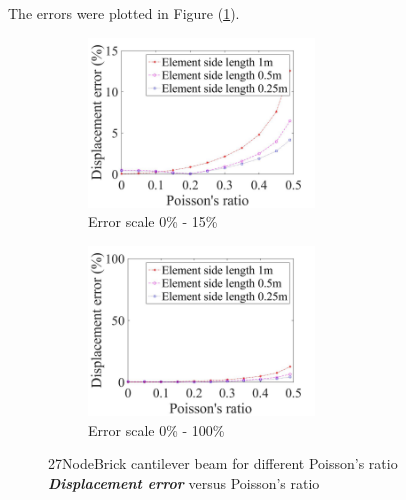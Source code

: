 \documentclass[fleqn,11pt,letter]{article}
\begin{document}
The errors were plotted in Figure (\ref{fig error 27NodeBrick cantilever beam for different Poisson's ratio}).

\begin{figure}[H]
  \begin{subfigure}{0.5\textwidth}
    \centering
    \includegraphics[width=6cm]{../Figure_files/27NodeBrick/error27brick_beam_different_poisson_ratio_disp_div.jpeg}
    \caption{Error scale 0\% - 15\%}
  \end{subfigure}
  \begin{subfigure}{0.5\textwidth}
    \centering
    \includegraphics[width=6cm]{../Figure_files/27NodeBrick/error27brick_beam_different_poisson_ratio_disp_div100.jpeg}
    \caption{Error scale 0\% - 100\%}
  \end{subfigure}
  \captionsetup{justification=centering,margin=3cm}
  \caption{27NodeBrick cantilever beam for different Poisson's ratio\\
     \textbf{\emph{ Displacement error }}  versus   Poisson's ratio}
  \label{fig error 27NodeBrick cantilever beam for different Poisson's ratio}
\end{figure}
\end{document}
